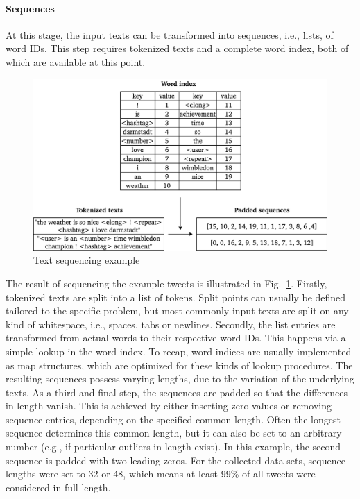 
\paragraph{Sequences}
\label{sub:sequences}

At this stage, the input texts can be transformed into sequences, i.e., lists,
of word IDs.
This step requires tokenized texts and a complete word index, both of which
are available at this point.

\begin{figure}[h]
  \includegraphics[width=\textwidth]{img/text_preprocessing_3}
  \caption{Text sequencing example}
\label{fig:text_sequencing}
\end{figure}

The result of sequencing the example tweets is illustrated in Fig.~\ref{fig:text_sequencing}.
Firstly, tokenized texts are split into a list of tokens.
Split points can usually be defined tailored to the specific problem, but
most commonly input texts are split on any kind of whitespace, i.e., spaces,
tabs or newlines.
Secondly, the list entries are transformed from actual words to their respective
word IDs.
This happens via a simple lookup in the word index.
To recap, word indices are usually implemented as map structures, which are
optimized for these kinds of lookup procedures.
The resulting sequences possess varying lengths, due to the variation of the
underlying texts.
As a third and final step, the sequences are padded so that the differences in
length vanish.
This is achieved by either inserting zero values or removing sequence entries,
depending on the specified common length.
Often the longest sequence determines this common length, but it can also be
set to an arbitrary number (e.g., if particular outliers in length exist).
In this example, the second sequence is padded with two leading zeros.
For the collected data sets, sequence lengths were set to 32 or 48, which
means at least 99\% of all tweets were considered in full length.

